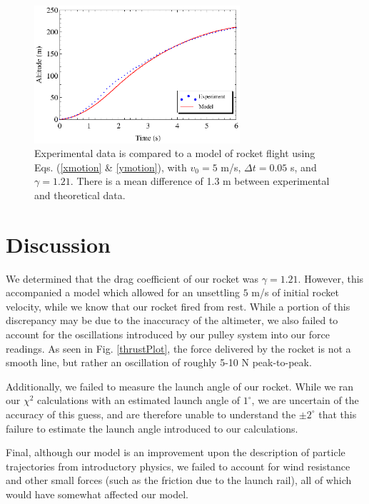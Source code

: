 \documentclass[aps,pra,twocolumn]{revtex4-1}
\begin{document}
\begin{figure} [b!]
	\includegraphics[width=3in]{Mirage-G38-BestFit.eps}
	\caption{Experimental data is compared to a model of rocket flight using Eqs. (\ref{xmotion} \& \ref{ymotion}), with $v_0 = 5$ m/s, $\Delta t = 0.05$ s, and $\gamma = 1.21$.  There is a mean difference of 1.3 m between experimental and theoretical data.  \label{experiment}}
\end{figure}


\section{\label{section 5} Discussion}
We determined that the drag coefficient of our rocket was $\gamma = 1.21$.  However, this accompanied a model which allowed for an unsettling $5$ m/s of initial rocket velocity, while we know that our rocket fired from rest.  While a portion of this discrepancy may be due to the inaccuracy of the altimeter, we also failed to account for the oscillations introduced by our pulley system into our force readings.  As seen in Fig. \ref{thrustPlot}, the force delivered by the rocket is not a smooth line, but rather an oscillation of roughly 5-10 N peak-to-peak.

Additionally, we failed to measure the launch angle of our rocket.  While we ran our $\chi^2$ calculations with an estimated launch angle of $1^\circ$, we are uncertain of the accuracy of this guess, and are therefore unable to understand the $\pm 2^\circ$ that this failure to estimate the launch angle introduced to our calculations.

Final, although our model is an improvement upon the description of particle trajectories from introductory physics, we failed to account for wind resistance and other small forces (such as the friction due to the launch rail), all of which would have somewhat affected our model.


\end{document}
